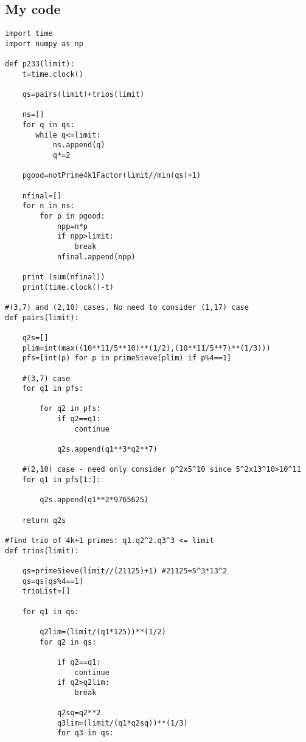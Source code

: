 \documentclass[11pt, oneside]{article}   	%
\begin{document}
\subsection{My code}
\begin{verbatim}
import time
import numpy as np

def p233(limit):
    t=time.clock()
    
    qs=pairs(limit)+trios(limit) 
        
    ns=[]
    for q in qs:
       while q<=limit:
           ns.append(q)
           q*=2
           
    pgood=notPrime4k1Factor(limit//min(qs)+1) 
       
    nfinal=[]
    for n in ns:
        for p in pgood:
            npp=n*p
            if npp>limit:
                break
            nfinal.append(npp)
    
    print (sum(nfinal))
    print(time.clock()-t)

#(3,7) and (2,10) cases. No need to consider (1,17) case  
def pairs(limit):
    
    q2s=[]
    plim=int(max((10**11/5**10)**(1/2),(10**11/5**7)**(1/3)))
    pfs=[int(p) for p in primeSieve(plim) if p%4==1]
    
    #(3,7) case
    for q1 in pfs:
        
        for q2 in pfs:
            if q2==q1: 
                continue
            
            q2s.append(q1**3*q2**7)
            
    #(2,10) case - need only consider p^2x5^10 since 5^2x13^10>10^11
    for q1 in pfs[1:]: 
              
        q2s.append(q1**2*9765625)
        
    return q2s
        
#find trio of 4k+1 primes: q1.q2^2.q3^3 <= limit
def trios(limit):
    
    qs=primeSieve(limit//(21125)+1) #21125=5^3*13^2
    qs=qs[qs%4==1]    
    trioList=[]
    
    for q1 in qs:
        
        q2lim=(limit/(q1*125))**(1/2)
        for q2 in qs:
            
            if q2==q1:
                continue
            if q2>q2lim:
                break
            
            q2sq=q2**2
            q3lim=(limit/(q1*q2sq))**(1/3)            
            for q3 in qs:
                

\end{verbatim}
\end{document}
